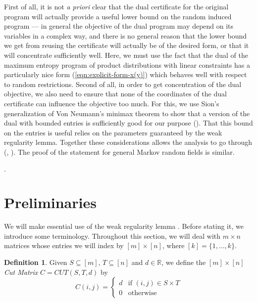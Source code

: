 \documentclass[final, 12pt]{colt2018}
\newcommand{\R}{\mathbb{R}}
\newtheorem{defn}[theorem]{Definition}
\theoremstyle{definition}
\newtheorem{defn}[theorem]{Definition}
\theoremstyle{plain}
\begin{document}
First of all, it is not \emph{a priori} clear that the dual certificate for the original program will actually provide a useful lower bound on the random induced program --- in general the objective of the dual program may depend on its variables in a complex way, and there is no general reason 
that the lower bound we get from reusing the certificate
will actually be of the desired form, or that it will concentrate sufficiently well. Here, we must use the fact that the dual of the maximum entropy program of product distributions with linear constraints has a particularly nice form (\cref{eqn:explicit-form-x(y)}) which behaves well with respect to random restrictions.
Second of all, in order to get concentration of the dual objective, we also need to ensure that none of the coordinates of the dual certificate can influence the objective too much. For this, we use Sion's generalization of Von Neumann's minimax theorem to show that a version of the dual with bounded entries is sufficiently good for our purpose (). That this bound on the entries is useful relies on the parameters guaranteed by the weak regularity lemma. Together these considerations allows the analysis to go through (, ). 
The proof of the statement for general Markov random fields is similar.       

.
 
%


\appendix

\section{Preliminaries}

We will make essential use of the weak regularity lemma \citep{frieze-kannan-matrix}. Before stating
it, we introduce some terminology. Throughout this section, we will
deal with $m\times n$ matrices whose entries we will index by $[m]\times[n]$,
where $[k]=\{1,\dots,k\}$. 
\begin{defn}
Given $S\subseteq[m]$, $T\subseteq[n]$ and $d\in\R$, we define
the $[m]\times[n]$ \emph{Cut Matrix }$C=CUT(S,T,d)$ by 
\[
C(i,j)=\begin{cases}
d & \text{if }(i,j)\in S\times T\\
0 & \text{otherwise}
\end{cases}
\]
\end{defn}
\end{document}
